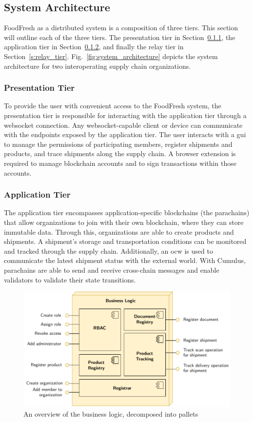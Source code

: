 \documentclass[conference]{IEEEtran}
\begin{document}
\subsection{System Architecture} \label{s:system_architecture}
FoodFresh as a distributed system is a composition of three tiers. 
This section will outline each of the three tiers. The presentation tier in Section~\ref{s:presentation_tier}, the application tier in Section~\ref{s:application_tier}, and finally the relay tier in Section~\ref{s:relay_tier}. Fig.~\ref{fig:system_architecture} depicts the system architecture for two interoperating supply chain organizations. 

\subsubsection{Presentation Tier} \label{s:presentation_tier}
To provide the user with convenient access to the FoodFresh system, the presentation tier is responsible for interacting with the application tier through a websocket connection. 
Any websocket-capable client or device can communicate with the endpoints exposed by the application tier. The user interacts with a \ac{gui} to manage the permissions of participating members, register shipments and products, and trace shipments along the supply chain. A browser extension is required to manage blockchain accounts and to sign transactions within those accounts.

\subsubsection{Application Tier} \label{s:application_tier}
The application tier encompasses application-specific blockchains (the parachains) that allow organizations to join with their own blockchain, where they can store immutable data. Through this, organizations are able to create products and shipments. A shipment's storage and transportation conditions can be monitored and tracked through the supply chain. Additionally, an \ac{ocw} is used to communicate the latest shipment status with the external world. With Cumulus, parachains are able to send and receive cross-chain messages and enable validators to validate their state transitions.

\begin{figure}[h!]
\centerline{\includegraphics[scale=0.6]{business_logic}}
\caption{An overview of the business logic, decomposed into pallets}
\label{fig:business_logic}
\end{figure}
\end{document}
